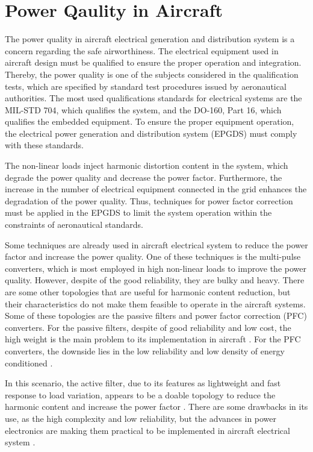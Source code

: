 \section{Power Qaulity in Aircraft}\label{sec:Power_Quality}

The power quality in aircraft electrical generation and distribution system is a concern regarding the safe airworthiness. The electrical equipment used in aircraft design must be qualified to ensure the proper operation and integration. Thereby, the power quality is one of the subjects considered in the qualification tests, which are specified by standard test procedures issued by aeronautical authorities. The most used qualifications standards for electrical systems are the MIL-STD 704, which qualifies the system, and the DO-160, Part 16, which qualifies the embedded equipment. To ensure the proper equipment operation, the electrical power generation and distribution system (EPGDS) must comply with these standards.

The non-linear loads inject harmonic distortion content in the system, which degrade the power quality and decrease the power factor. Furthermore, the increase in the number of electrical equipment connected in the grid enhances the degradation of the power quality. Thus, techniques for power factor correction must be applied in the EPGDS to limit the system operation within the constraints of aeronautical standards.

Some techniques are already used in aircraft electrical system to reduce the power factor and increase the power quality. One of these techniques is the multi-pulse converters, which is most employed in high non-linear loads to improve the power quality. However, despite of the good reliability, they are bulky and heavy. There are some other topologies that are useful for harmonic content reduction, but their characteristics do not make them feasible to operate in the aircraft systems. Some of these topologies are the passive filters and power factor correction (PFC) converters. For the passive filters, despite of good reliability and low cost, the high weight is the main problem to its implementation in aircraft \citep{Barruel2004}. For the PFC converters, the downside lies in the low reliability and low density of energy conditioned \citep{Zhu2014,Gong2003,Lobo2005}. 

In this scenario, the active filter, due to its features as lightweight and fast response to load variation, appears to be a doable topology to reduce the harmonic content and increase the power factor \citep{Zhu2014,Chen2012control,Karatzaferis2013}. There are some drawbacks in its use, as the high complexity and low reliability, but the advances in power electronics are making them practical to be implemented in aircraft electrical system \citep{Abdelhafez2009}.





